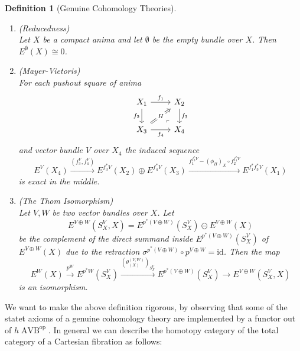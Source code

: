 \documentclass{article}
\newcommand{\xto}{\xrightarrow}
\newcommand{\op}{\mathrm{op}}
\newcommand{\id}{\mathrm{id}}
\DeclareMathOperator{\AVB}{AVB}
\newtheorem{definition}{Definition}
\begin{document}
\begin{definition}[Genuine Cohomology Theories]
\begin{enumerate}
    \item[(iii)]\label{reduced} (Reducedness)\\
      Let $X$ be a compact anima and 
      let $\emptyset$ be the empty bundle over $X$. Then 
      $E^\emptyset(X) \cong 0$.
    \item[(iv)]\label{mayervietoris} (Mayer-Vietoris)\\
    For each pushout square of anima
    \[\begin{tikzcd}
      {X_1} & {X_2} \\
      {X_3} & {X_4}
      \arrow["{f_1}", from=1-1, to=1-2]
      \arrow["{f_3}", from=1-2, to=2-2]
      \arrow["{f_2}"', from=1-1, to=2-1]
      \arrow["{f_4}"', from=2-1, to=2-2]
      \arrow["\lrcorner"{anchor=center, pos=0.125, rotate=180}, draw=none, from=2-2, to=1-1]
      \arrow["H"{description}, Rightarrow, from=2-1, to=1-2]
    \end{tikzcd}\]
    and vector bundle $V$ over $X_4$ the induced sequence
    \[
      E^{V}(X_4) \xto{(f_3^V,f_4^V)} E^{f_3^*V}(X_2)\oplus E^{f_4^*V}(X_3)
      \xto{f_1^{f_3^*V} - ({\phi_H})_X \circ f_2^{f_4^*V}} E^{f_1^*f_3^*V}(X_1)
      \]
    is exact in the middle.
    \item[(v)]\label{thomiso}(The Thom Isomorphism)\\
    Let $V,W$ be two vector bundles over $X$. Let
    \[E^{V\oplus W}(S_X^V,X) =
    E^{p^*(V\oplus W)}(S_X^V) \ominus E^{V\oplus W}(X)
    \] be the complement of
    the direct summand inside $E^{p^*(V\oplus W)}(S_X^{V})$ of $E^{V\oplus W}(X)$
    due to the retraction $\sigma^{p^*(V\oplus W)} \circ p^{V\oplus W} = \id$.
    Then the map
    \[
    E^W(X) \xto{p^W} E^{p^*W}(S_X^V) \xto{(\theta_{(X)}^{(V,W)})_{S_X^V}} E^{p^*(V \oplus W)}(S_X^V) \to E^{V\oplus W}(S_X^V,X)
    \]
    is an isomorphism.
  \end{enumerate}
  
  \end{definition}
  
  We want to make the above definition rigorous, by observing that some of the statet 
  axioms of a genuine cohomology theory are implemented by a functor 
  out of $h\AVB^\op$. In general we can describe the homotopy category of the 
  total category of a Cartesian fibration as follows:
  
\end{document}
